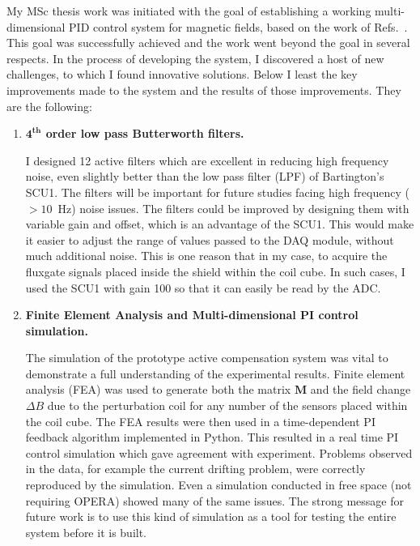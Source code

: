 My MSc thesis work was initiated with the goal of establishing a
working multi-dimensional PID control system for magnetic fields,
based on the work of Refs.~\cite{bea,lins}.  This goal was
successfully achieved and the work went beyond the goal in several
respects.  In the process of developing the system, I discovered a host
of new challenges, to which I found innovative solutions.  Below I
least the key improvements made to the system and the results of those
improvements.  They are the following:
\begin{enumerate}
\item {\bf $\mathbf{4^{th}}$ order low pass Butterworth filters.}  

I designed 12 active filters which are excellent in reducing high frequency noise, even slightly better than the low pass filter (LPF) of Bartington's SCU1. The filters will be important for future studies facing high frequency ($>10$~Hz) noise issues. The filters could be improved by designing them with variable gain and offset, which is an advantage of the SCU1. This would make it easier to adjust the range of values passed to the DAQ module, without much additional noise. This is one reason that in my case, to acquire the fluxgate signals placed inside the shield within the coil cube. In such cases, I used the SCU1 with gain 100 so that it can easily be read by the ADC.  

\item {\bf Finite Element Analysis and Multi-dimensional PI control simulation.}  

The simulation of the prototype active compensation system was vital to demonstrate a full understanding of the experimental results. Finite element analysis (FEA) was used to generate both the matrix $\bm{M}$ and the field change $\Delta B$ due to the perturbation coil for any number of the sensors placed within the coil cube. The FEA results were then used in a time-dependent PI feedback algorithm implemented in Python. This resulted in a real time PI control simulation which gave agreement with experiment. Problems observed in the data, for example the current drifting problem, were correctly reproduced by the simulation. Even a simulation conducted in free space (not requiring OPERA) showed many of the same issues. The strong message for future work is to use this kind of simulation as a tool for testing the entire system before it is built.



\end{enumerate}
